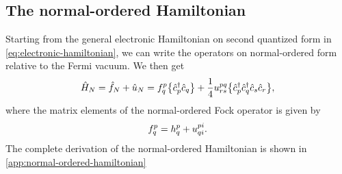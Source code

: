         \subsection{The normal-ordered Hamiltonian}
            \label{subsec:normal-ordered-hamiltonian}
            Starting from the general electronic Hamiltonian on second quantized
            form in \autoref{eq:electronic-hamiltonian}, we can write the
            operators on normal-ordered form relative to the Fermi vacuum.
            We then get
            \begin{align}
                \hat{H}_N
                = \hat{f}_N + \hat{u}_N
                = f^{p}_{q}\bigl\{ 
                    \hat{c}_{p}^{\dagger}
                    \hat{c}_{q}
                 \bigr\}
                + \frac{1}{4}u^{pq}_{rs}\bigl\{ 
                    \hat{c}_{p}^{\dagger}
                    \hat{c}_{q}^{\dagger}
                    \hat{c}_{s}
                    \hat{c}_{r}
                 \bigr\},
            \end{align}
            where the matrix elements of the normal-ordered Fock operator is
            given by
            \begin{align}
                f^{p}_{q}
                = h^{p}_{q}
                + u^{pi}_{qi}.
            \end{align}
            The complete derivation of the normal-ordered Hamiltonian is shown
            in \autoref{app:normal-ordered-hamiltonian}


